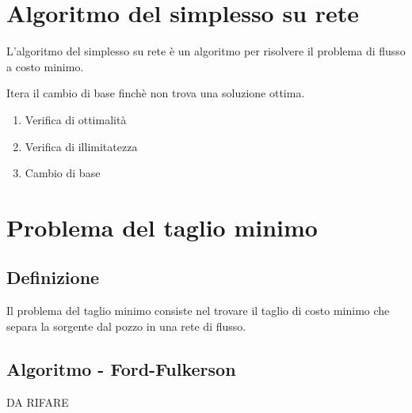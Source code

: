 \section{Algoritmo del simplesso su rete}
L'algoritmo del simplesso su rete \`e un algoritmo per risolvere il problema di flusso a costo minimo.

Itera il cambio di base finch\`e non trova una soluzione ottima.

\begin{enumerate}
  \item Verifica di ottimalit\`a
  \item Verifica di illimitatezza
  \item Cambio di base
\end{enumerate}



\section{Problema del taglio minimo}
\subsection{Definizione}
Il problema del taglio minimo consiste nel trovare il taglio di costo minimo che separa la sorgente dal pozzo in una rete di flusso.

\subsection{Algoritmo - Ford-Fulkerson}
DA RIFARE

